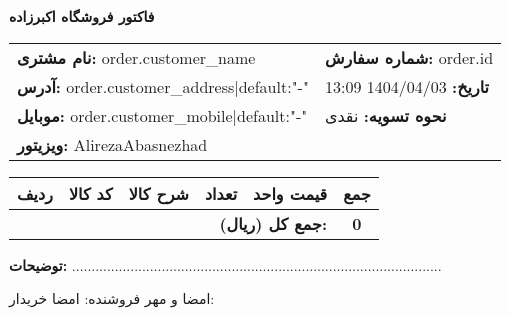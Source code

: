 \documentclass[a4paper,12pt]{article}
\begin{document}
        \begin{center}
            \textbf{\LARGE فاکتور فروشگاه اکبرزاده}
        \end{center}

        \vspace{0.5cm}

        \noindent
        \begin{tabular}{ p{7cm} p{7cm} }
        \textbf{نام مشتری:} {{ order.customer_name }} & \textbf{شماره سفارش:} {{ order.id }} \\
        \textbf{آدرس:} {{ order.customer_address|default:"-" }} & \textbf{تاریخ:} 1404/04/03 13:09 \\
        \textbf{موبایل:} {{ order.customer_mobile|default:"-" }} & \textbf{نحوه تسویه:} نقدی \\
        \textbf{ویزیتور:} AlirezaAbasnezhad & \\
        \end{tabular}

        \vspace{0.7cm}

        \begin{longtable}{|c|c|c|c|c|c|}
        \hline
        \textbf{ردیف} & \textbf{کد کالا} & \textbf{شرح کالا} & \textbf{تعداد} & \textbf{قیمت واحد} & \textbf{جمع} \\
        \hline
        \endhead
        
        \multicolumn{5}{|r|}{\textbf{جمع کل (ریال):}} & \textbf{0} \\
        \hline
        \end{longtable}
        \vspace{0.5cm}

        \noindent
        \textbf{توضیحات:} ...............................................................................................

        \vspace{2cm}
        \begin{flushleft}
        امضا و مهر فروشنده: \hspace{8cm} امضا خریدار:
        \end{flushleft}

        
\end{document}
